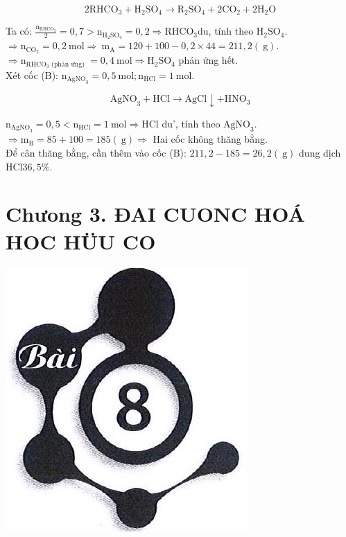 \documentclass[10pt]{article}
\begin{document}
$$
2 \mathrm{RHCO}_{3}+\mathrm{H}_{2} \mathrm{SO}_{4} \rightarrow \mathrm{R}_{2} \mathrm{SO}_{4}+2 \mathrm{CO}_{2}+2 \mathrm{H}_{2} \mathrm{O}
$$

Ta có: $\frac{\mathrm{n}_{\mathrm{RHCO}_{3}}}{2}=0,7>\mathrm{n}_{\mathrm{H}_{2} \mathrm{SO}_{4}}=0,2 \Rightarrow \mathrm{RHCO}_{3} \mathrm{du}$, tính theo $\mathrm{H}_{2} \mathrm{SO}_{4}$.\\
$\Rightarrow \mathrm{n}_{\mathrm{CO}_{2}}=0,2 \mathrm{~mol} \Rightarrow \mathrm{~m}_{\mathrm{A}}=120+100-0,2 \times 44=211,2(\mathrm{~g})$.\\
$\Rightarrow \mathrm{n}_{\mathrm{RHCO}_{3} \text { (phản ứng) }}=0,4 \mathrm{~mol} \Rightarrow \mathrm{H}_{2} \mathrm{SO}_{4}$ phản ứng hết.\\
Xét cốc (B): $\mathrm{n}_{\mathrm{AgNO}_{3}}=0,5 \mathrm{~mol} ; \mathrm{n}_{\mathrm{HCl}}=1 \mathrm{~mol}$.

$$
\mathrm{AgNO}_{3}+\mathrm{HCl} \rightarrow \mathrm{AgCl} \downarrow+\mathrm{HNO}_{3}
$$

$\mathrm{n}_{\mathrm{AgNO}_{3}}=0,5<\mathrm{n}_{\mathrm{HCl}}=1 \mathrm{~mol} \Rightarrow \mathrm{HCl}$ du', tính theo $\mathrm{AgNO}_{3}$.\\
$\Rightarrow \mathrm{m}_{\mathrm{B}}=85+100=185(\mathrm{~g}) \Rightarrow$ Hai cốc không thăng bằng.\\
Để cân thăng bằng, cần thêm vào cốc (B): $211,2-185=26,2(\mathrm{~g})$ dung dịch $\mathrm{HCl} 36,5 \%$.

\section*{Chưong 3. ĐAI CUONC HOÁ HOC HÜU CO}
\begin{center}
\includegraphics[max width=\textwidth]{2025_10_23_adad5b98d65ac6665838g-13}
\end{center}
\end{document}

